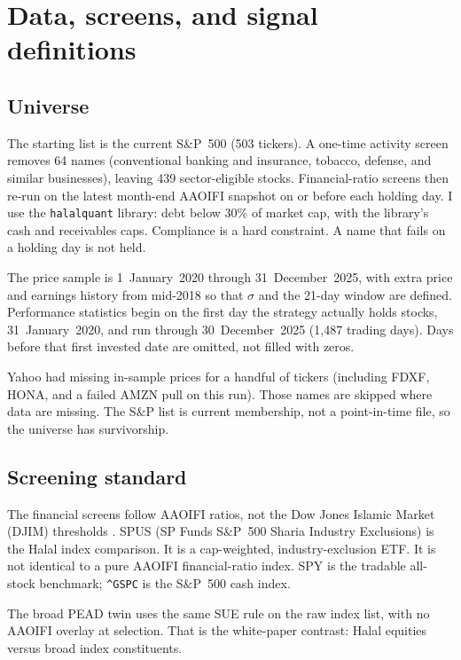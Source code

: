\documentclass[11pt,letterpaper]{article}
\begin{document}
\section{Data, screens, and signal definitions}
\label{sec:data}

\subsection{Universe}

The starting list is the current S\&P~500 (503 tickers). A one-time activity screen removes 64 names (conventional banking and insurance, tobacco, defense, and similar businesses), leaving 439 sector-eligible stocks. Financial-ratio screens then re-run on the latest month-end AAOIFI snapshot on or before each holding day. I use the \texttt{halalquant} library: debt below 30\% of market cap, with the library's cash and receivables caps. Compliance is a hard constraint. A name that fails on a holding day is not held.

The price sample is 1~January~2020 through 31~December~2025, with extra price and earnings history from mid-2018 so that $\sigma$ and the 21-day window are defined. Performance statistics begin on the first day the strategy actually holds stocks, 31~January~2020, and run through 30~December~2025 (1{,}487 trading days). Days before that first invested date are omitted, not filled with zeros.

Yahoo had missing in-sample prices for a handful of tickers (including FDXF, HONA, and a failed AMZN pull on this run). Those names are skipped where data are missing. The S\&P list is current membership, not a point-in-time file, so the universe has survivorship.

\subsection{Screening standard}

The financial screens follow AAOIFI ratios, not the Dow Jones Islamic Market (DJIM) thresholds \citep{aaoifi21,derigs2008}. SPUS (SP Funds S\&P~500 Sharia Industry Exclusions) is the Halal index comparison. It is a cap-weighted, industry-exclusion ETF. It is not identical to a pure AAOIFI financial-ratio index. SPY is the tradable all-stock benchmark; \texttt{\^{}GSPC} is the S\&P~500 cash index.

The broad PEAD twin uses the same SUE rule on the raw index list, with no AAOIFI overlay at selection. That is the white-paper contrast: Halal equities versus broad index constituents.
\end{document}
